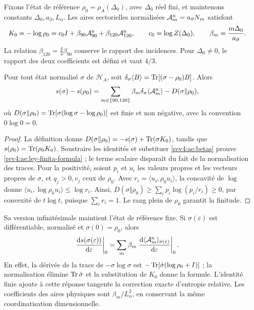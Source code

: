 Fixons l'état de référence \(\rho_0=\rho_A(\Delta_0)\), avec \(\Delta_0\) réel fini, et maintenons constants \(\Delta_0,a_\partial,L_\alpha\). Les aires sectorielles normalisées \(\mathcal A_m^{\rm n}=a_\partial N_m\) satisfont
\begin{equation}
 K_0=-\log\rho_0=c_0I+
 \beta_{90}\mathcal A_{90}^{\rm n}
 +\beta_{120}\mathcal A_{120}^{\rm n},
 \qquad c_0=\log Z(\Delta_0),\qquad
 \beta_m=\frac{m\Delta_0}{a_\partial}.
 \label{rev4:ae:betas}
\end{equation}
La relation \(\beta_{120}=\tfrac43\beta_{90}\) conserve le rapport des incidences. Pour \(\Delta_0\ne0\), le rapport des deux coefficients est défini et vaut \(4/3\).

\begin{theorem}
\label{rev4:ae:ley-finita}
Pour tout état normalisé \(\sigma\) de \(\mathscr H_A\), soit \(\delta_\sigma\langle B\rangle=\operatorname{Tr}[(\sigma-\rho_0)B]\). Alors
\begin{equation}
 s(\sigma)-s(\rho_0)
 =\sum_{m\in\{90,120\}}\beta_m
       \delta_\sigma\langle\mathcal A_m^{\rm n}\rangle
   -D(\sigma\Vert\rho_0),
 \label{rev4:ae:ley-finita-formula}
\end{equation}
où \(D(\sigma\Vert\rho_0)=
\operatorname{Tr}[\sigma(\log\sigma-\log\rho_0)]\) est finie et non négative,
avec la convention \(0\log0=0\).
\end{theorem}
\begin{proof}
La définition donne \(D(\sigma\Vert\rho_0)=-s(\sigma)+\operatorname{Tr}(\sigma K_0)\), tandis que \(s(\rho_0)=\operatorname{Tr}(\rho_0K_0)\). Soustraire les identités et substituer \eqref{rev4:ae:betas} prouve \eqref{rev4:ae:ley-finita-formula} ; le terme scalaire disparaît du fait de la normalisation des traces. Pour la positivité, soient \(p_i\) et \(u_i\) les valeurs propres et les vecteurs propres de \(\sigma\), et \(q_j>0,v_j\) ceux de \(\rho_0\). Avec \(r_i=\langle u_i,\rho_0u_i\rangle\), la concavité de \(\log\) donne \(\langle u_i,\log\rho_0u_i\rangle\le\log r_i\). Ainsi, \(D(\sigma\Vert\rho_0)\ge\sum_i p_i\log(p_i/r_i)\ge0\), par convexité de \(t\log t\), puisque \(\sum_i r_i=1\). Le rang plein de \(\rho_0\) garantit la finitude.
\end{proof}

Sa version infinitésimale maintient l’état de référence fixe. Si
\(\sigma(\varepsilon)\) est différentiable, normalisé et
\(\sigma(0)=\rho_0\), alors
\[
 \left.\frac{\mathrm d s(\sigma(\varepsilon))}{\mathrm d\varepsilon}\right|_0
 =\sum_m\beta_m
  \left.\frac{\mathrm d\langle\mathcal A_m^{\rm n}\rangle_{
                          \sigma(\varepsilon)}}{\mathrm d\varepsilon}\right|_0.
\]
En effet, la dérivée de la trace de \(-\sigma\log\sigma\) est \(-\operatorname{Tr}[\dot\sigma(\log\rho_0+I)]\) ; la normalisation élimine \(\operatorname{Tr}\dot\sigma\) et la substitution de \(K_0\) donne la formule. L'identité finie ajoute à cette réponse tangente la correction exacte d'entropie relative. Les coefficients des aires physiques sont \(\beta_m/L_\alpha^2\), en conservant la même coordinatisation dimensionnelle.

